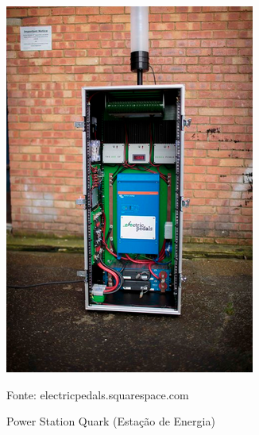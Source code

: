 \begin{itemize}
	\begin{figure}[H]
	 \centering
	\label{Estação de energia}
	 \includegraphics[keepaspectratio=true,scale=0.8]{figuras/capacitor.png}
	 \caption{Power Station Quark (Estação de Energia)}
	 \small{Fonte: electricpedals.squarespace.com}
	\end{figure}	
	
\end{itemize}

